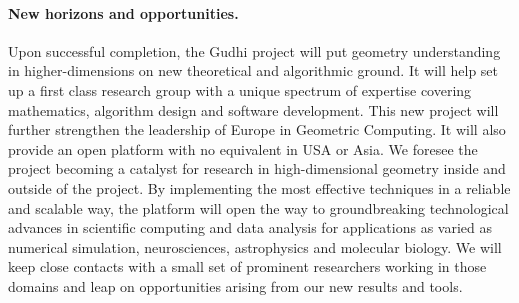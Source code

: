 


\paragraph{New horizons and opportunities.} 




Upon successful completion, the Gudhi project will put geometry understanding in higher-dimensions on new theoretical and algorithmic ground. It will help set up a first class research group with a unique spectrum of expertise covering mathematics, algorithm design and software development.
This new project will further strengthen the leadership of Europe  in Geometric Computing.
It will also provide an open platform with no equivalent in USA or Asia.
We foresee the project becoming a catalyst for research in high-dimensional geometry inside and outside of the project.  
By implementing the most effective techniques in a  reliable and scalable way, the platform will
open the way to groundbreaking technological advances in scientific computing and data analysis for applications as varied as numerical simulation, neurosciences, astrophysics and molecular biology. We will keep close contacts with a small set of prominent researchers working in those domains and leap on opportunities arising from our new results and tools. %

